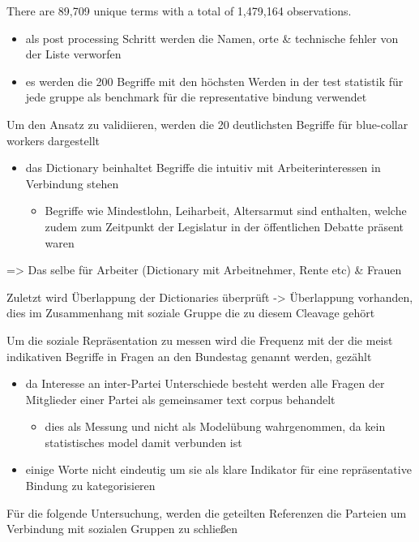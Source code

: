 \documentclass[11pt]{article}
\begin{document}
\begin{enumerate}
There are 89,709 unique terms with a total of 1,479,164 observations.

\begin{itemize}
\item als post processing Schritt werden die Namen, orte \& technische fehler von der Liste verworfen
\item es werden die 200 Begriffe mit den höchsten Werden in der test statistik für jede gruppe als benchmark für die representative bindung verwendet
\end{itemize}

Um den Ansatz zu validiieren, werden die 20 deutlichsten Begriffe für blue-collar workers dargestellt 

\begin{itemize}
\item das Dictionary beinhaltet Begriffe die intuitiv mit Arbeiterinteressen in Verbindung stehen 
\begin{itemize}
\item Begriffe wie Mindestlohn, Leiharbeit, Altersarmut sind enthalten, welche zudem zum Zeitpunkt der Legislatur in der öffentlichen Debatte präsent waren
\end{itemize}
\end{itemize}

=> Das selbe für Arbeiter (Dictionary mit Arbeitnehmer, Rente etc) \& Frauen 

Zuletzt wird Überlappung der Dictionaries überprüft -> Überlappung vorhanden, dies im Zusammenhang mit soziale Gruppe die zu diesem Cleavage gehört 

Um die soziale Repräsentation zu messen wird die Frequenz mit der die meist indikativen Begriffe in Fragen an den Bundestag genannt werden, gezählt 

\begin{itemize}
\item da Interesse an inter-Partei Unterschiede besteht werden alle Fragen der Mitglieder einer Partei als gemeinsamer text corpus behandelt 
\begin{itemize}
\item dies als Messung und nicht als Modelübung wahrgenommen, da kein statistisches model damit verbunden ist
\end{itemize}
\item einige Worte nicht eindeutig um sie als klare Indikator für eine repräsentative Bindung zu kategorisieren
\end{itemize}

Für die folgende Untersuchung, werden die geteilten Referenzen die Parteien um Verbindung mit sozialen Gruppen zu schließen 


\end{enumerate}
\end{document}
